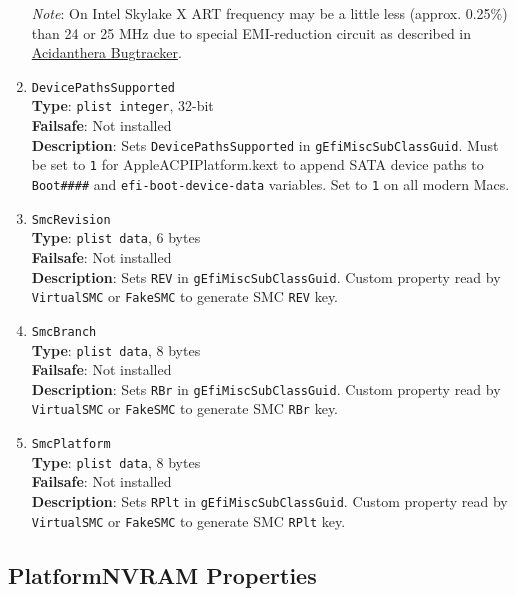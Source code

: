 \documentclass[]{article}
\begin{document}
\begin{enumerate}
  \emph{Note}: On Intel Skylake X ART frequency may be a little less (approx. 0.25\%) than
  24 or 25 MHz due to special EMI-reduction circuit as described in
  \href{https://github.com/acidanthera/bugtracker/issues/448#issuecomment-524914166}{Acidanthera Bugtracker}.
\item
  \texttt{DevicePathsSupported}\\
  \textbf{Type}: \texttt{plist\ integer}, 32-bit\\
  \textbf{Failsafe}: Not installed\\
  \textbf{Description}: Sets \texttt{DevicePathsSupported} in
  \texttt{gEfiMiscSubClassGuid}. Must be set to \texttt{1} for
  AppleACPIPlatform.kext to append SATA device paths to
  \texttt{Boot\#\#\#\#} and \texttt{efi-boot-device-data} variables.
  Set to \texttt{1} on all modern Macs.
\item
  \texttt{SmcRevision}\\
  \textbf{Type}: \texttt{plist\ data}, 6 bytes\\
  \textbf{Failsafe}: Not installed\\
  \textbf{Description}: Sets \texttt{REV} in
  \texttt{gEfiMiscSubClassGuid}. Custom property read by
  \texttt{VirtualSMC} or \texttt{FakeSMC} to generate SMC \texttt{REV}
  key.
\item
  \texttt{SmcBranch}\\
  \textbf{Type}: \texttt{plist\ data}, 8 bytes\\
  \textbf{Failsafe}: Not installed\\
  \textbf{Description}: Sets \texttt{RBr} in
  \texttt{gEfiMiscSubClassGuid}. Custom property read by
  \texttt{VirtualSMC} or \texttt{FakeSMC} to generate SMC \texttt{RBr}
  key.
\item
  \texttt{SmcPlatform}\\
  \textbf{Type}: \texttt{plist\ data}, 8 bytes\\
  \textbf{Failsafe}: Not installed\\
  \textbf{Description}: Sets \texttt{RPlt} in
  \texttt{gEfiMiscSubClassGuid}. Custom property read by
  \texttt{VirtualSMC} or \texttt{FakeSMC} to generate SMC \texttt{RPlt}
  key.
\end{enumerate}

\subsection{PlatformNVRAM Properties}\label{platforminfonvram}
\end{document}
